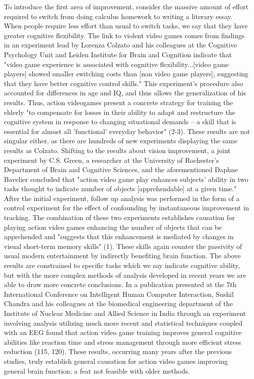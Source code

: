 \documentclass[12pt]{article}
\begin{document}
\begin{flushleft}
To introduce the first area of improvement, consider the massive amount of effort required to switch from doing calculus homework to writing a literary essay.
When people require less effort than usual to switch tasks, we say that they have greater cognitive flexibility. The link to violent video games comes from findings in an experiment lead by Lorenza Colzato and his colleagues at the Cognitive Psychology Unit and Leiden Institute for Brain and Cognition indicate that "video game experience is associated with cognitive flexibility...[video game players] showed smaller switching costs than [non video game players], suggesting that they have better cognitive control skills." This experiment's procedure also accounted for differences in age and IQ, and thus allows the generalization of his results. Thus, action videogames present a concrete strategy for training the elderly "to compensate for losses in their ability to adapt and restructure the cognitive system in response to changing situational demands -- a skill that is essential for almost all 'functional' everyday behavior" (2-3). These results are not singular either, as there are hundreds of new experiments displaying the same results as Colzato.
Shifting to the results about vision improvement, a joint experiment by C.S. Green, a researcher at the University of Rochester's Department of Brain and Cognitive Sciences, and the aforementioned Daphne Bavelier concluded that "action video game play enhances subjects' ability in two tasks thought to indicate number of objects [apprehendable] at a given time." After the initial experiment, follow up analysis was performed in the form of a control experiment for the effect of confounding by instantaneous improvement in tracking. The combination of these two experiments establishes causation for playing action video games enhancing the number of objects that can be apprehended and "suggests that this enhancement is mediated by changes in visual short-term memory skills" (1). These skills again counter the passivity of usual modern entertainment by indirectly benefiting brain function. The above results are constrained to specific tasks which we say indicate cognitive ability, but with the more complex methods of analysis developed in recent years we are able to draw more concrete conclusions.
In a publication presented at the 7th International Conference on Intelligent Human Computer Interaction, Sushil Chandra and his colleagues at the  biomedical engineering department of the Institute of Nuclear Medicine and Allied Science in India through an experiment involving analysis utilizing much more recent and statistical techniques coupled with an EEG found that action video game training improves general cognitive abilities like reaction time and stress management through more efficient stress reduction (115, 120). These results, occurring many years after the previous studies, truly establish general causation for action video games improving general brain function; a feat not feasible with older methods.

\end{flushleft}
\end{document}
